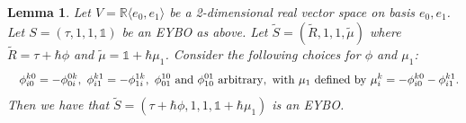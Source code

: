 \documentclass[11pt,fleqn]{amsart} %
\newtheorem{lemma}[theorem]{Lemma}
\begin{document}
\begin{lemma} \label{lem:cocy_tau}
Let $V = \mathbb R\langle e_0,e_1\rangle$ be a 2-dimensional real
vector space on basis $e_0, e_1$. 
Let $S=(\tau, 1, 1, \mathbb 1)$ be an EYBO as above. 
Let $\tilde S=(\tilde R, 1, 1, \tilde \mu)$ where $\tilde R = \tau + 	\hbar \phi$ and $\tilde \mu= \mathbb 1 + \hbar \mu_1$.
Consider the following choices for $\phi$ and $\mu_1$:
\begin{eqnarray} \quad
\phi_{i0}^{k0} = - \phi_{0i}^{0k}, \ 
\phi_{i1}^{k1} = - \phi_{1i}^{1k}, \
\phi_{01}^{10} \ {\rm and} \  \phi_{10}^{01} \ {\rm arbitrary,\  with} \ 
 \mu_1 \ {\rm defined \ by}\  \mu_i^k = -\phi_{i0}^{k0} - \phi_{i1}^{k1}.
\label{eq:phi}
\end{eqnarray}
Then %
we have that 
$\tilde S =(\tau + \hbar \phi, 1, 1, \mathbb 1 + \hbar \mu_1)$ is an EYBO. 

\end{lemma}
\end{document}

